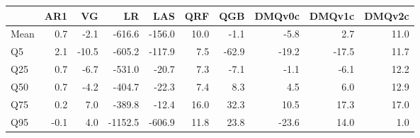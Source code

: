 \begin{tabular}{lrrrrrrrrr}
\toprule
 & AR1 & VG & LR & LAS & QRF & QGB & DMQv0c & DMQv1c & DMQv2c \\
\midrule
Mean & 0.7 & -2.1 & -616.6 & -156.0 & 10.0 & -1.1 & -5.8 & 2.7 & 11.0 \\
Q5 & 2.1 & -10.5 & -605.2 & -117.9 & 7.5 & -62.9 & -19.2 & -17.5 & 11.7 \\
Q25 & 0.7 & -6.7 & -531.0 & -20.7 & 7.3 & -7.1 & -1.1 & -6.1 & 12.2 \\
Q50 & 0.7 & -4.2 & -404.7 & -22.3 & 7.4 & 8.3 & 4.5 & 6.0 & 12.9 \\
Q75 & 0.2 & 7.0 & -389.8 & -12.4 & 16.0 & 32.3 & 10.5 & 17.3 & 17.0 \\
Q95 & -0.1 & 4.0 & -1152.5 & -606.9 & 11.8 & 23.8 & -23.6 & 14.0 & 1.0 \\
\bottomrule
\end{tabular}
